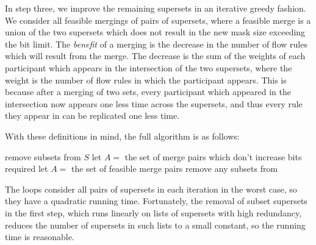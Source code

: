 In step three, we improve the remaining supersets in an iterative greedy fashion. We consider all feasible mergings of pairs of supersets, where a feasible merge is a union of the two supersets which does not result in the new mask size exceeding the bit limit. The \textit{benefit} of a merging is the decrease in the number of flow rules which will result
from the merge. The decrease is the sum of the weights of each participant which appears in the intersection of the two supersets, where the weight is the number of flow rules in which the participant appears. This is because after a merging of two sets, every participant which appeared in the intersection now appears one less time across the supersets, and thus every rule they appear in can be replicated one less time. 

With these definitions in mind, the full algorithm is as follows:

\begin{algorithm}
remove subsets from $S$\;
let $A =$ the set of merge pairs which don't increase bits required\;
let $A =$ the set of feasible merge pairs\;
remove any subsets from
\end{algorithm}

The loops consider all pairs of supersets in each iteration in the worst case, so they have a quadratic running time. Fortunately, the removal of subset supersets in the first step, which runs linearly on lists of supersets with high redundancy, reduces the number of supersets in such lists to a small constant, so the running time is reasonable.




